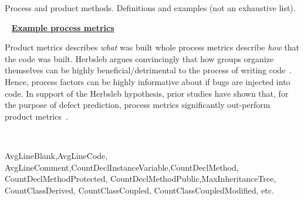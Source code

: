  
\begin{table}[!b]
\caption{Process and product methods. Definitions and examples (not an exhaustive list).}
{\small
~
\hspace{0.3in} 
{\underline {\bf Example process metrics}}
\\ 
\begin{minipage}{.30\linewidth}
Product metrics describes  {\em what} was built whole process metrics describe {\em how} that  the code was built.  Herbsleb argues convincingly that how groups organize themselves
can be highly beneficial/detrimental to the process of writing code~\cite{Herbsleb14}. Hence, process factors
can be highly informative about if bugs are injected into code. In support
of the Herbsleb hypothesis, prior studies have shown that, for the purpose of defect prediction,
process metrics significantly out-perform product metrics~\cite{Lumpe12,Ra13,bird2009promises}. 
\end{minipage}~~~
\begin{minipage}{.20\linewidth}
AvgLineBlank,\newline AvgLineCode, \newline AvgLineComment,\newline  CountDeclInstanceVariable,\newline CountDeclMethod, \newline   CountDeclMethodProtected, \newline CountDeclMethodPublic,\newline  MaxInheritanceTree,  \newline CountClassDerived, \newline CountClassCoupled, CountClassCoupledModified,  \newline    etc.    
~\\~\\~\\
\end{minipage}}~~~~~
\begin{minipage}{.40\linewidth}
 

\end{minipage}
\end{table}
